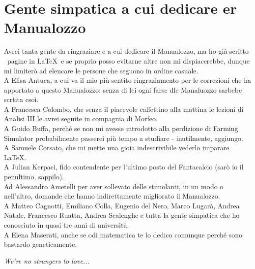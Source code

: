 \section*{Gente simpatica a cui dedicare er Manualozzo}
Avrei tanta gente da ringraziare e a cui dedicare il Manualozzo, ma ho già scritto \thelastpage\  pagine in \LaTeX\ e se proprio posso evitarne altre non mi dispiacerebbe, dunque mi limiterò ad elencare le persone che seguono in ordine casuale.\\
A Elisa Antuca, a cui va il mio più sentito ringraziamento per le correzioni che ha apportato a questo Manualozzo: senza di lei ogni farse dle Manaluozzo sarbebe scrtita csoì.\\
A Francesca Colombo, che senza il piacevole caffettino alla mattina le lezioni di Analisi III le avrei seguite in compagnia di Morfeo.\\
A Guido Buffa, perché se non mi avesse introdotto alla perdizione di Farming Simulator probabilmente passerei più tempo a studiare - inutilmente, aggiungo.\\
A Samuele Corsato, che mi mette una gioia indescrivibile vederlo imparare \LaTeX.\\
A Julian Kerpaci, fido contendente per l'ultimo posto del Fantacalcio (sarò io il penultimo, sappilo).\\
Ad Alessandro Ametelli per aver sollevato delle stimolanti, in un modo o nell'altro, domande che hanno indirettamente migliorato il Manualozzo.\\
A Matteo Cagnotti, Emiliano Colla, Eugenio del Nero, Marco Lugarà, Andrea Natale, Francesco Ruatta, Andrea Scalenghe e tutta la gente simpatica che ho conosciuto in quasi tre anni di università.\\
A Elena Maserati, anche se odi matematica te lo dedico comunque perché sono bastardo geneticamente.
\vfill
\begin{flushright}
	\textit{We're no strangers to love...}
\end{flushright}